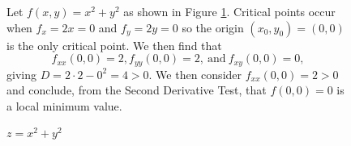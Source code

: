 \begin{figure}[ht]
  \begin{minipage}{3.75in}
    \begin{example} Let $f(x,y) = x^2+y^2$ as
      shown in Figure \ref{F:10.7.min}.  Critical points occur when $f_x
      = 2x = 0$ and $f_y=2y = 0$ so the origin $(x_0, y_0)= (0,0)$ is
      the only critical point.  We then find that
      $$
      f_{xx}(0,0) = 2, f_{yy}(0,0) = 2,\ \mbox{and} \ f_{xy}(0,0) = 0,
      $$
      giving $D = 2\cdot2 - 0^2 = 4 > 0$.  We then consider
      $f_{xx}(0,0) = 2 > 0$ and conclude, from the Second Derivative
      Test, that $f(0,0) = 0$ is a local minimum value.
    \end{example}
  \end{minipage}
  \hspace*{0.25in}
  \begin{minipage}[h]{2.5in}
    \begin{center}
      \caption{$z=x^2+y^2$}
      \label{F:10.7.min}
    \end{center}
  \end{minipage}


\end{figure}
